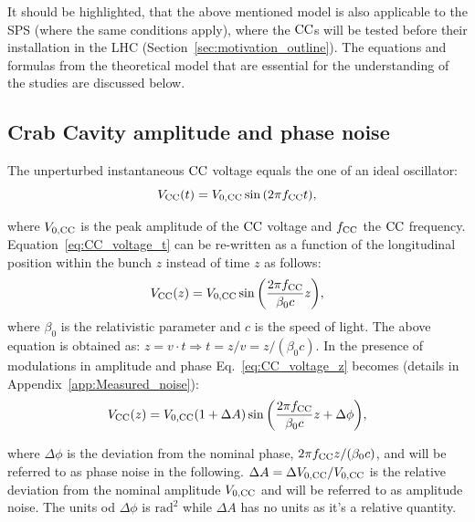 It should be highlighted, that the above mentioned model is also applicable to the SPS (where the same conditions apply), where the ${\mathrm{CC}}$s will be tested before their installation in the LHC (Section~\ref{sec:motivation_outline}). %
The equations and formulas from the theoretical model that are essential for the understanding of the studies are discussed below.


\subsection{Crab Cavity amplitude and phase noise}\label{subsec:AN_PN}
The unperturbed instantaneous ${\mathrm{CC}}$ voltage equals the one of an ideal oscillator:
\begin{equation}\label{eq:CC_voltage_t}
    V_\mathrm{CC}(t) = {V_\mathrm{0, CC}} \sin{\left ( 2 \pi {f_\mathrm{CC}}t \right )},
\end{equation}

where ${V_\mathrm{0, CC}}$ is the peak amplitude of the ${\mathrm{CC}}$ voltage and ${f_\mathrm{CC}}$ the ${\mathrm{CC}}$ frequency. Equation~\eqref{eq:CC_voltage_t} can be re-written as a function of the longitudinal position within the bunch $z$ instead of time $z$ as follows:
\begin{equation}\label{eq:CC_voltage_z}
    V_\mathrm{CC}(z) = {V_\mathrm{0, CC}} \sin{\left ( \frac{2\pi {f_\mathrm{CC}}}{\beta_0 c}z \right )},
\end{equation}
where $\beta_0$ is the relativistic parameter and $c$ is the speed of light. The above equation is obtained as: $z=v \cdot t \Rightarrow t=z/v=z/(\beta_0 c)$.
In the presence of modulations in amplitude and phase Eq.~\eqref{eq:CC_voltage_z} becomes (details in Appendix~\ref{app:Measured_noise}):
\begin{equation}\label{eq:CC_voltage_z}
    V_\mathrm{CC}(z) = {V_\mathrm{0, CC}} (1+\Delta A) \sin{\left ( \frac{2\pi {f_\mathrm{CC}}}{\beta_0 c}z + \Delta \phi \right )},
\end{equation}

where $\Delta \phi$ is the deviation from the nominal phase, $2\pi {f_\mathrm{CC}} z/(\beta_0 c)$, and will be referred to as phase noise in the following. $\Delta A = \Delta {V_\mathrm{0, CC}} / {V_\mathrm{0, CC}}$ is the relative deviation from the nominal amplitude ${V_\mathrm{0, CC}}$ and will be referred to as amplitude noise. The units od $\Delta \phi$ is $\mathrm{rad^2}$ while $\Delta A$ has no units as it's a relative quantity.

